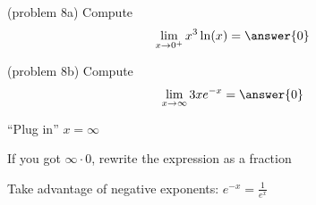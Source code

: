 \documentclass[handout]{ximera}
\begin{document}
\begin{problem}(problem 8a)
  Compute
  \[
  \lim_{x \to 0^+} x^3\ln(x) = \answer{0}
  \]
  
\end{problem}



\begin{problem}(problem 8b)
  Compute
  \[
  \lim_{x \to \infty} 3xe^{-x} = \answer{0}
  \]
  
    \begin{hint}
      ``Plug in'' $x=\infty$
    \end{hint}
    \begin{hint}
      If you got $\infty \cdot 0$, rewrite the expression as a fraction
    \end{hint}
    \begin{hint}
      Take advantage of negative exponents: $e^{-x} = \frac{1}{e^x}$
    \end{hint}
	
\end{problem}


\begin{center}
\begin{foldable}
\end{foldable}
\end{center}
\end{document}
